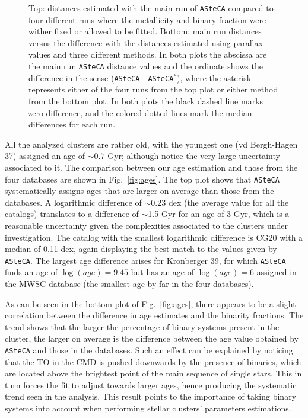 \documentclass{aa}
\begin{document}
  \begin{figure}
   \caption{Top: distances estimated with the main run of \texttt{ASteCA}
   compared to four different runs where the metallicity and binary fraction
   were wither fixed or allowed to be fitted.
   Bottom: main run distances versus the difference with the distances
   estimated using parallax values and three different methods.
   In both plots the abscissa are the main run \texttt{ASteCA} distance values
   and the ordinate shows the difference in the sense (\texttt{ASteCA} - 
   \texttt{ASteCA}$^*$), where the asterisk represents either of the four runs
   from the top plot or either method from the bottom plot.
   In both plots the black dashed line marks zero difference, and the colored
   dotted lines mark the median differences for each run.}
   \label{fig:dist_comparisions}
  \end{figure}

  All the analyzed clusters are rather old, with the youngest one (vd
  Bergh-Hagen 37) assigned an age of $\sim0.7$ Gyr; although notice the very
  large uncertainty associated to it.
  The comparison between our age estimation and those from
  the four databases are shown in Fig.~\ref{fig:ages}. The top plot
  shows that \texttt{ASteCA} systematically assigns ages that are larger on
  average than those from the databases.
  A logarithmic difference of $\sim$0.23 dex (the average value for
  all the catalogs) translates to a difference of $\sim$1.5 Gyr for
  an age of 3 Gyr, which is a reasonable uncertainty given the complexities
  associated to the clusters under investigation. The catalog with the
  smallest logarithmic difference is CG20 with a median of 0.11 dex, again
  displaying the best match to the values given by \texttt{ASteCA}.
  The largest age difference arises for Kronberger 39, for
  which \texttt{ASteCA} finds an age of $\log(age)=9.45$ but has an age of
  $\log(age)=6$ assigned in the MWSC database (the smallest age by far in the four
  databases).

  As can be seen in the bottom plot of Fig.~\ref{fig:ages}, there appears to be
  a slight correlation between the difference in age estimates and the
  binarity fractions. The trend shows that the larger the percentage of
  binary systems present in the cluster, the larger on average is the difference
  between the age value obtained by \texttt{ASteCA} and those in the
  databases. Such an effect can be explained by noticing that the TO in the CMD
  is pushed downwards by the presence of binaries, which are located above the
  brightest point of the main sequence of single stars. This in turn forces the
  fit to adjust towards larger ages, hence producing the systematic trend
  seen in the analysis. This result points to the importance of taking binary
  systems into account when performing stellar clusters' parameters estimations.
  \\
\end{document}
